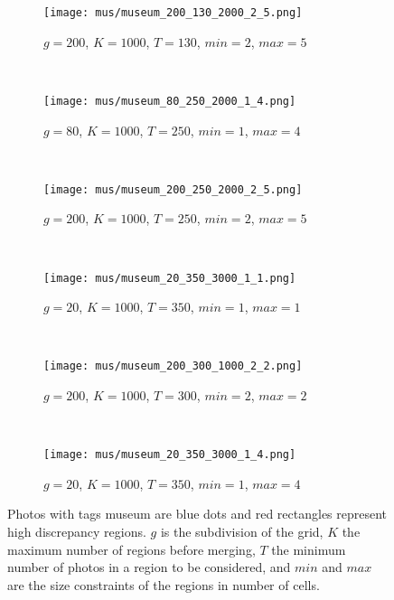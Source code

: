 \begin{figure}
        \centering
        \begin{subfigure}[b]{0.38\textwidth}
                \texttt{[image: mus/museum\_200\_130\_2000\_2\_5.png]}
                \caption{$g=200$, $K=1000$, $T=130$, $min=2$, $max=5$}
        \end{subfigure}~
        \begin{subfigure}[b]{0.38\textwidth}
                \texttt{[image: mus/museum\_80\_250\_2000\_1\_4.png]}
                \caption{$g=80$, $K=1000$, $T=250$, $min=1$, $max=4$}
        \end{subfigure}~

        \begin{subfigure}[b]{0.38\textwidth}
                \texttt{[image: mus/museum\_200\_250\_2000\_2\_5.png]}
                \caption{$g=200$, $K=1000$, $T=250$, $min=2$, $max=5$}
        \end{subfigure}~
        \begin{subfigure}[b]{0.38\textwidth}
                \texttt{[image: mus/museum\_20\_350\_3000\_1\_1.png]}
                \caption{$g=20$, $K=1000$, $T=350$, $min=1$, $max=1$}
        \end{subfigure}~

        \begin{subfigure}[b]{0.38\textwidth}
                \texttt{[image: mus/museum\_200\_300\_1000\_2\_2.png]}
                \caption{$g=200$, $K=1000$, $T=300$, $min=2$, $max=2$}
        \end{subfigure}~
        \begin{subfigure}[b]{0.38\textwidth}
                \texttt{[image: mus/museum\_20\_350\_3000\_1\_4.png]}
                \caption{$g=20$, $K=1000$, $T=350$, $min=1$, $max=4$}
        \end{subfigure}
        \caption{Photos with tags \textsf{museum} are blue dots and red
rectangles represent high discrepancy regions. $g$ is the subdivision of the
grid, $K$ the maximum number of regions before merging, $T$ the minimum
number of photos in a region to be considered, and $min$ and $max$ are the
size constraints of the regions in number of cells.\label{f:mus}}
\end{figure}
